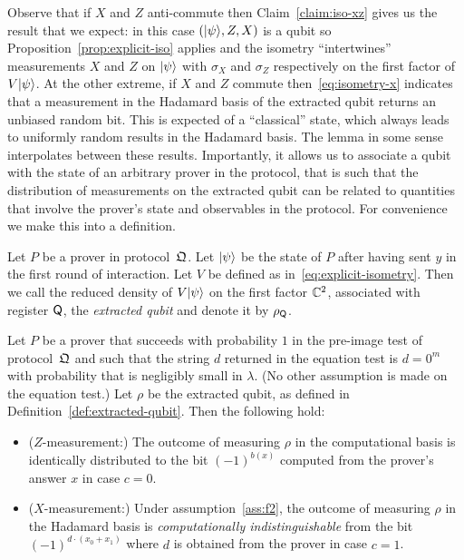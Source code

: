 Observe that if $X$ and $Z$ anti-commute then Claim~\ref{claim:iso-xz} gives us the result that we expect: in this case $(|\psi\rangle,Z,X)$ is a qubit so Proposition~\ref{prop:explicit-iso} applies and the isometry ``intertwines'' measurements $X$ and $Z$ on $|\psi\rangle$ with $\sigma_X$ and $\sigma_Z$ respectively on the first factor of $V|\psi\rangle$. At the other extreme, if $X$ and $Z$ commute then~\eqref{eq:isometry-x} indicates that a measurement in the Hadamard basis of the extracted qubit returns an unbiased random bit. This is expected of a ``classical'' state, which always leads to uniformly random results in the Hadamard basis. The lemma in some sense interpolates between these results. Importantly, it allows us to associate a qubit with the state of an arbitrary prover in the protocol, that is such that the distribution of measurements on the extracted qubit can be related to  quantities that involve the prover's state and observables in the protocol. For convenience we make this into a definition. 

\begin{definition}\label{def:extracted-qubit}
Let $P$ be a prover in protocol~$\mathfrak{Q}$. Let $|\psi\rangle$ be the state of $P$ after having sent $y$ in the first round of interaction. Let $V$ be defined as in~\eqref{eq:explicit-isometry}. Then we call the reduced density of $V|\psi\rangle$ on the first factor $\mathbb{C}^2$, associated with register ${\textsf{Q}}$, the \emph{extracted qubit} and denote it by $\rho_{\textsf{Q}}$. 
\end{definition}

\begin{lemma}\label{lem:comp-ind-qubits}
Let $P$ be a prover that succeeds with probability $1$ in the pre-image test of  protocol~$\mathfrak{Q}$ and such that the string $d$ returned in the equation test is $d=0^m$ with probability that is negligibly small in $\lambda$. (No other assumption is made on the equation test.) Let $\rho$ be the extracted qubit, as defined in Definition~\ref{def:extracted-qubit}. Then the following hold:
\begin{itemize}
\item ($Z$-measurement:) The outcome of measuring $\rho$ in the computational basis is identically distributed to the bit $(-1)^{b(x)}$ computed from the prover's answer $x$ in case $c=0$.
\item ($X$-measurement:) Under assumption~\ref{ass:f2}, the outcome of measuring $\rho$ in the Hadamard basis is \emph{computationally indistinguishable} from the bit $(-1)^{d\cdot(x_0+x_1)}$ where $d$ is obtained from the prover in case $c=1$.
\end{itemize}
\end{lemma}


